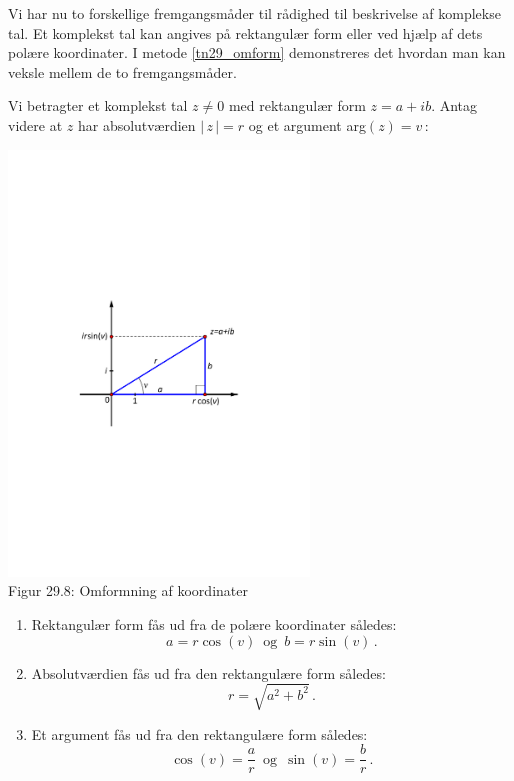  
Vi har nu to forskellige fremgangsmåder til rådighed
til beskrivelse af komplekse tal. Et komplekst tal kan angives på rektangulær form eller ved hjælp af dets polære koordinater. I metode \ref{tn29_omform} demonstreres det hvordan man kan veksle mellem de to fremgangsmåder. 

\begin{method}\label{tn29_omform}
Vi betragter et komplekst tal $z\neq 0$ med rektangulær form $z=a+ib$. Antag videre at $z$ har absolutværdien $|\,z\,|=r$ og et argument arg$(z)=v\,$: 
\begin{center}
	\includegraphics[trim=3cm 10.5cm 3cm 10.5cm,width=0.6\textwidth,clip]{Geometer/omformning1.pdf}\\
Figur 29.8: Omformning af koordinater
\end{center}
\begin{enumerate}
\item
Rektangulær form fås ud fra de polære koordinater således:
\begin{equation}\label{tn29_omform1}
a=r\cos(v)\,\,\,\mathrm{og}\,\,\,b=r\sin(v)\,.
\end{equation}
\item
Absolutværdien fås ud fra den rektangulære form således:
\begin{equation}\label{tn29_omform2}
r=\sqrt{a^2+b^2}\,.
\end{equation}
\item
Et argument fås ud fra den rektangulære form således:
\begin{equation}\label{tn29_omform3}
\cos(v)=\frac a r \,\,\,\mathrm{og}\,\,\,\sin(v)=\frac b r\,. 
\end{equation}
\end{enumerate}
\end{method}
